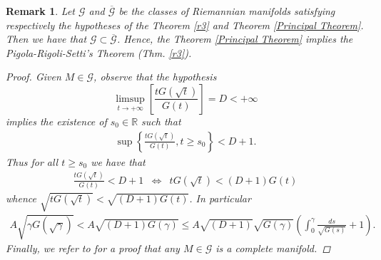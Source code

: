 \documentclass[a4paper]{amsart}
\newtheorem{remark}{Remark}
\begin{document}
\begin{remark}
Let $\mathcal{G}$ and $\overline{\mathcal{G}}$ be the classes of Riemannian manifolds satisfying respectively the hypotheses of the Theorem \ref{r3} and Theorem \ref{Principal Theorem}. Then we have that $\mathcal{G} \subset \overline{\mathcal{G}}$.  Hence, the Theorem \ref{Principal Theorem} implies the Pigola-Rigoli-Setti's Theorem (Thm. \ref{r3}).
\begin{proof}Given $M \in \mathcal{G}$, observe that the hypothesis $$\displaystyle{\limsup_{t \rightarrow +\infty}\left[\frac{tG(\sqrt{t})}{G(t)}\right] = D < +\infty} $$ implies the existence of  $s_{0} \in \mathbb{R}$ such that
\begin{eqnarray}
\sup\left\{\frac{tG(\sqrt{t})}{G(t)}, t \geq s_{0} \right\} < D + 1.
\end{eqnarray}
Thus for all $t \geq s_{0}$ we have that
\begin{eqnarray}
\frac{tG(\sqrt{t})}{G(t)} < D + 1 & \Leftrightarrow & tG(\sqrt{t})< (D+1)G(t)
\end{eqnarray}
whence $ \sqrt{tG(\sqrt{t})} < \sqrt{(D+1)G(t)}$. In particular
\begin{eqnarray*}
A\sqrt{\gamma G(\sqrt{\gamma})} < A\sqrt{(D+1)G(\gamma)} \leq A\sqrt{(D+1)}\sqrt{G(\gamma)}\left(\int_{0}^{\gamma}\frac{ds}{\sqrt{G(s)}}+1\right).
\end{eqnarray*}
Finally, we refer to \cite[p.10]{prs-memoirs}  for a proof that any $M \in \mathcal{G}$ is a complete manifold.
\end{proof}
\end{remark}
\end{document}
